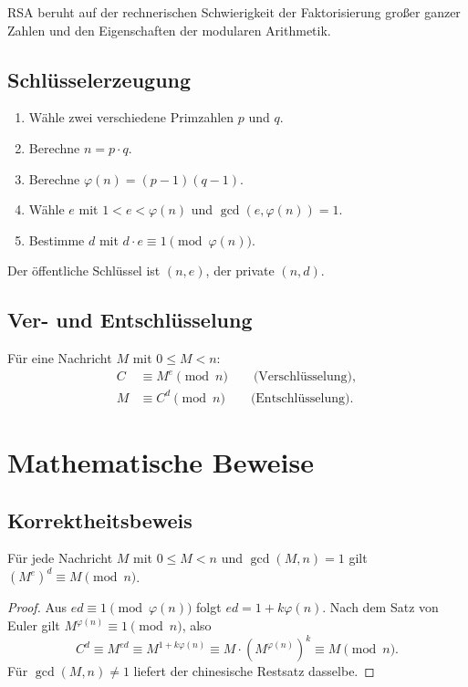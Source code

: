 RSA beruht auf der rechnerischen Schwierigkeit der Faktorisierung großer
ganzer Zahlen und den Eigenschaften der modularen Arithmetik.

\subsection{Schlüsselerzeugung}

\begin{enumerate}
  \item Wähle zwei verschiedene Primzahlen $p$ und $q$.
  \item Berechne $n = p \cdot q$.
  \item Berechne $\varphi(n) = (p-1)(q-1)$.
  \item Wähle $e$ mit $1 < e < \varphi(n)$ und $\gcd(e, \varphi(n))=1$.
  \item Bestimme $d$ mit $d \cdot e \equiv 1 \pmod{\varphi(n)}$.
\end{enumerate}

Der öffentliche Schlüssel ist $(n,e)$, der private $(n,d)$.

\subsection{Ver- und Entschlüsselung}

Für eine Nachricht $M$ mit $0 \le M < n$:
\begin{align}
  C &\equiv M^e \pmod n \qquad \text{(Verschlüsselung)}, \\
  M &\equiv C^d \pmod n \qquad \text{(Entschlüsselung)}.
\end{align}

\section{Mathematische Beweise}

\subsection{Korrektheitsbeweis}

\begin{theorem}
Für jede Nachricht $M$ mit $0 \le M < n$ und $\gcd(M,n)=1$ gilt
$(M^e)^d \equiv M \pmod n$.
\end{theorem}
\begin{proof}
Aus $ed \equiv 1 \pmod{\varphi(n)}$ folgt $ed = 1+k\varphi(n)$.
Nach dem Satz von Euler gilt $M^{\varphi(n)} \equiv 1 \pmod n$, also
\[
  C^d \equiv M^{ed} \equiv M^{1+k\varphi(n)} \equiv
  M \cdot (M^{\varphi(n)})^k \equiv M \pmod n.
\]
Für $\gcd(M,n) \neq 1$ liefert der chinesische Restsatz dasselbe.
\end{proof}

